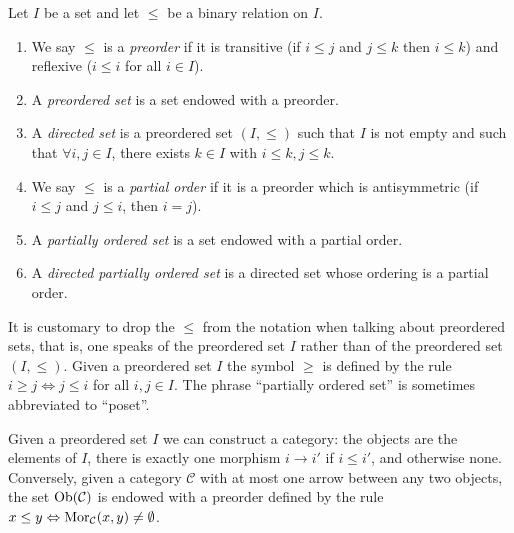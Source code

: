 \begin{definition}
\label{definition-directed-set}
Let $I$ be a set and let $\leq$ be a binary relation on $I$.
\begin{enumerate}
\item We say $\leq$ is a {\it preorder} if it is
transitive (if $i \leq j$ and $j \leq k$ then $i \leq k$) and
reflexive ($i \leq i$ for all $i \in I$).
\item A {\it preordered set} is a set endowed with a preorder.
\item A {\it directed set} is a preordered set $(I, \leq)$
such that $I$ is not empty and such that $\forall i, j \in I$,
there exists $k \in I$ with $i \leq k, j \leq k$.
\item We say $\leq$ is a {\it partial order} if it is a preorder
which is antisymmetric (if $i \leq j$ and $j \leq i$, then $i = j$).
\item A {\it partially ordered set} is a set endowed with a partial order.
\item A {\it directed partially ordered set} is a directed set
whose ordering is a partial order.
\end{enumerate}
\end{definition}

\noindent
It is customary to drop the $\leq$ from the notation when talking
about preordered sets, that is, one speaks of
the preordered set $I$ rather than of the preordered set $(I, \leq)$.
Given a preordered set $I$ the symbol $\geq$ is defined by
the rule $i \geq j \Leftrightarrow j \leq i$ for all $i, j \in I$.
The phrase ``partially ordered set'' is sometimes abbreviated to ``poset''.

\medskip\noindent
Given a preordered set $I$ we can construct a category: the objects are
the elements of $I$, there is exactly one morphism $i \to i'$
if $i \leq i'$, and otherwise none. Conversely, given a category $\mathcal{C}$
with at most one arrow between any two objects, the set
$\mathop{\mathrm{Ob}}\nolimits(\mathcal{C})$ is endowed with a preorder defined by the rule
$x \leq y \Leftrightarrow \mathop{\mathrm{Mor}}\nolimits_\mathcal{C}(x, y) \not = \emptyset$.

